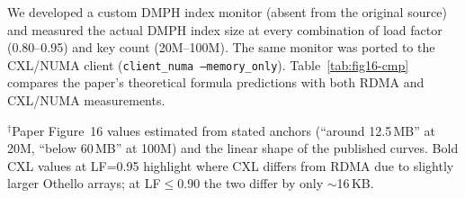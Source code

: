 \documentclass[11pt,a4paper]{article}
\begin{document}
We developed a custom DMPH index monitor (absent from the original source) and measured the actual DMPH index size at every combination of load factor (0.80--0.95) and key count (20M--100M). The same monitor was ported to the CXL/NUMA client (\texttt{client\_numa --memory\_only}). Table~\ref{tab:fig16-cmp} compares the paper's theoretical formula predictions with both RDMA and CXL/NUMA measurements.

\begin{table}[H]
\centering
\caption{Paper Figure~16 vs.\ RDMA and CXL/NUMA measured DMPH index size (MB). The paper's theoretical formula is $(2.33 + 2/\epsilon) \times n$ bits; its Figure~16 text states ``around 12.5\,MB'' for 20M keys and ``below 60\,MB'' for 100M keys.}
\label{tab:fig16-cmp}
\scriptsize
{}

\vspace{2pt}
{\scriptsize $^\dagger$Paper Figure~16 values estimated from stated anchors (``around 12.5\,MB'' at 20M, ``below 60\,MB'' at 100M) and the linear shape of the published curves. Bold CXL values at LF=0.95 highlight where CXL differs from RDMA due to slightly larger Othello arrays; at LF$\leq$0.90 the two differ by only $\sim$16\,KB.}
\end{table}
\end{document}
